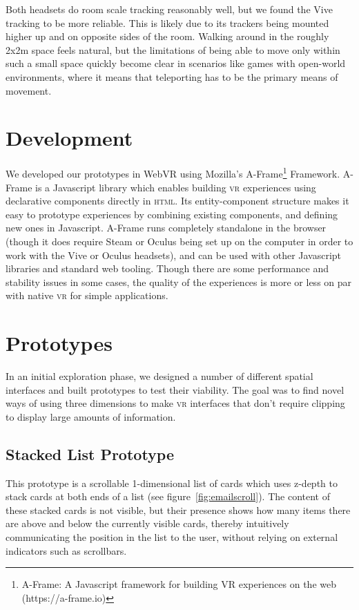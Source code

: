 \documentclass{tufte-book} %
\begin{document}
Both headsets do room scale tracking reasonably well, but we found the Vive tracking to be more reliable. This is likely due to its trackers being mounted higher up and on opposite sides of the room. Walking around in the roughly 2x2m space feels natural, but the limitations of being able to move only within such a small space quickly become clear in scenarios like games with open-world environments, where it means that teleporting has to be the primary means of movement.

\section{Development}
We developed our prototypes in WebVR using Mozilla's A-Frame\footnote{A-Frame: A Javascript framework for building VR experiences on the web (https://a-frame.io)} Framework. A-Frame is a Javascript library which enables building \textsc{vr} experiences using declarative components directly in \textsc{html}. Its entity-component structure makes it easy to prototype experiences by combining existing components, and defining new ones in Javascript. A-Frame runs completely standalone in the browser (though it does require Steam or Oculus being set up on the computer in order to work with the Vive or Oculus headsets), and can be used with other Javascript libraries and standard web tooling. Though there are some performance and stability issues in some cases, the quality of the experiences is more or less on par with native \textsc{vr} for simple applications.

\section{Prototypes}
In an initial exploration phase, we designed a number of different spatial interfaces and built prototypes to test their viability. The goal was to find novel ways of using three dimensions to make \textsc{vr} interfaces that don't require clipping to display large amounts of information.

\subsection{Stacked List Prototype}
This prototype is a scrollable 1-dimensional list of cards which uses z-depth to stack cards at both ends of a list (see figure~\ref{fig:emailscroll}). The content of these stacked cards is not visible, but their presence shows how many items there are above and below the currently visible cards, thereby intuitively communicating the position in the list to the user, without relying on external indicators such as scrollbars.
\end{document}
